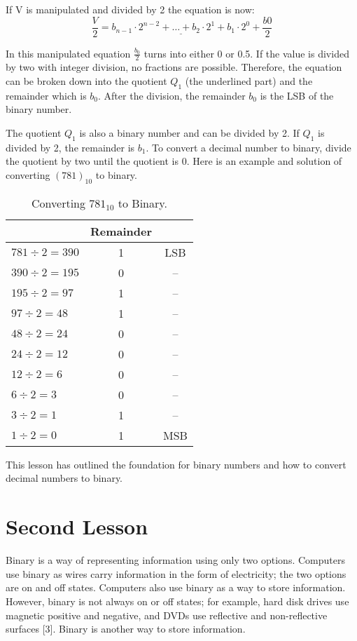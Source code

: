 \documentclass[twocolumn, 10pt]{article}
\begin{document}
If V is manipulated and divided by 2 the equation is now: 
\begin{equation}
\frac{V}{2} =  \underline{b_{n-1} \cdot 2^{n-2} + … + b_{2} \cdot 2^1 + b_{1} \cdot 2^0} + \frac{b0}{2}
\end{equation}

In this manipulated equation $\frac{b_{0}}{2}$ turns into either 0 or 0.5. If the value is divided by two with integer division, no fractions are possible. Therefore, the equation can be broken down into the quotient $Q_{1}$ (the underlined part) and the remainder which is $b_{0}$. After the division, the remainder $b_{0}$ is the LSB of the binary number. 

The quotient $Q_{1}$ is also a binary number and can be divided by 2. If $Q_{1}$ is divided by 2, the remainder is $b_{1}$. To convert a decimal number to binary, divide the quotient by two until the quotient is 0. Here is an example and solution of converting $(781)_{10}$ to binary.

\begin{table}[ht]
\centering
\caption{Converting $781_{10}$ to Binary.}
\begin{tabular}[t]{lcc}
\hline
&Remainder&\\
\hline
$781 \div 2 = 390$ &1&LSB\\
$390 \div 2 = 195$ &0&--\\
$195 \div 2 = 97$&1&--\\
$97 \div 2 = 48$&1&--\\
$48 \div 2 = 24$&0&--\\
$24 \div 2 = 12$&0&--\\
$12 \div 2 = 6$&0&--\\
$6 \div 2 = 3$&0&--\\
$3 \div 2 = 1$&1&--\\
$1 \div 2 = 0$&1&MSB \\
\hline

\end{tabular}
\end{table}%

This lesson has outlined the foundation for binary numbers and how to convert decimal numbers to binary. 
\section{Second Lesson}
Binary is a way of representing information using only two options. Computers use binary as wires carry information in the form of electricity; the two options are on and off states. Computers also use binary as a way to store information. However, binary is not always on or off states; for example, hard disk drives use magnetic positive and negative, and DVDs use reflective and non-reflective surfaces [3]. Binary is another way to store information.
\end{document}

